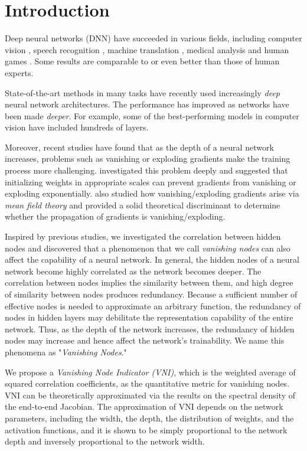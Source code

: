 \chapter{Introduction}
\label{introduction}

Deep neural networks (DNN) have succeeded in various fields, including computer vision \cite{alexnet}, speech recognition \cite{speech}, machine translation \cite{google_trans}, medical analysis \cite{medical} and human games \cite{alphago}. Some results are comparable to or even better than those of human experts.


State-of-the-art methods in many tasks have recently used increasingly \textit{deep} neural network architectures. The performance has improved as networks have been made \textit{deeper}. For example, some of the best-performing models \cite{resnet1, resnet2} in computer vision have included hundreds of layers.

Moreover, recent studies have found that as the depth of a neural network increases, problems such as vanishing or exploding gradients make the training process more challenging. \cite{xavier, he} investigated this problem deeply and suggested that initializing weights in appropriate scales can prevent gradients from vanishing or exploding exponentially.
\cite{mft:expo, mft:info} also studied how vanishing/exploding gradients arise via \textit{mean field theory} and provided a solid theoretical discriminant to determine whether the propagation of gradients is vanishing/exploding. 

Inspired by previous studies, we investigated the correlation between hidden nodes and discovered that a phenomenon that we call \textit{vanishing nodes} can also affect the capability of a neural network.
In general, the hidden nodes of a neural network become highly correlated as the network becomes deeper.
The correlation between nodes implies the similarity between them, and high degree of similarity between nodes produces redundancy.
Because a sufficient number of effective nodes is needed to approximate an arbitrary function, the redundancy of nodes in hidden layers may debilitate the representation capability of the entire network.
Thus, as the depth of the network increases, the redundancy of hidden nodes may increase and hence affect the network's trainability. We name this phenomena as "\textit{Vanishing Nodes}."

We propose a \textit{Vanishing Node Indicator (VNI)}, which is the weighted average of squared correlation coefficients, as the quantitative metric for vanishing nodes. VNI can be theoretically approximated via the results on the spectral density of the end-to-end Jacobian. The approximation of  VNI depends on the network parameters, including the width, the depth, the distribution of weights, and the activation functions, and it is shown to be simply proportional to the network depth and inversely proportional to the network width.

